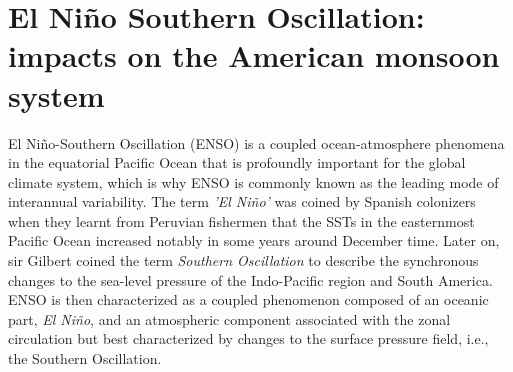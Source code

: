 \section{El Niño Southern Oscillation: impacts on the American monsoon system}
\label{sub:lit_enso}



 El Niño-Southern Oscillation (ENSO) is a coupled ocean-atmosphere phenomena in the equatorial Pacific Ocean that is profoundly important for the global climate system, which is why ENSO is commonly known as the leading mode of interannual variability. 
 The term \textit{'El Niño'} was coined by Spanish colonizers when they learnt from Peruvian fishermen that the SSTs in the easternmost Pacific Ocean increased notably in some years around December time. 
 Later on, sir Gilbert \cite{walker1924} coined the term \textit{Southern Oscillation} to describe the synchronous changes to the sea-level pressure of the Indo-Pacific region and South America. 
 ENSO is then characterized as a coupled phenomenon composed of an oceanic part, \textit{El Niño}, and an atmospheric component associated with the zonal circulation but best characterized by changes to the surface pressure field, i.e., the Southern Oscillation.
 
 
 
  
  
%  
%  
  
